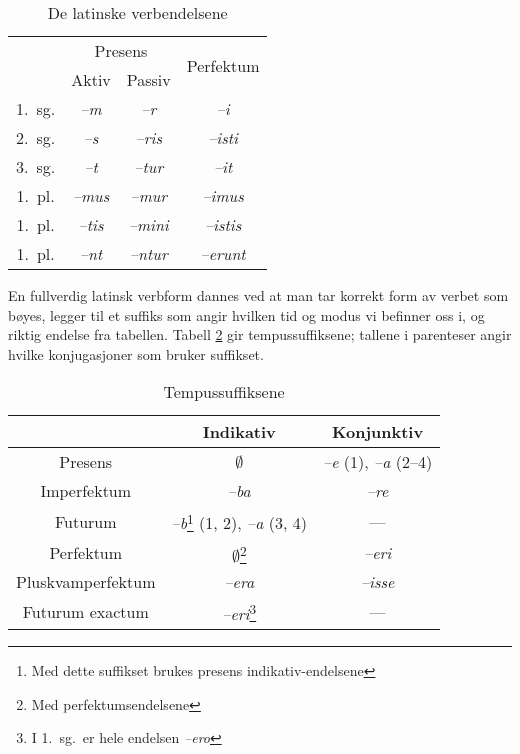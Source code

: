 \documentclass[a4paper]{article}
\begin{document}
\begin{table}[hp]
\begin{center}
\begin{tabular}{|c|c|c|c|}
    \hline
       & \multicolumn{2}{c|}{Presens} & \multirow{2}{*}{Perfektum} \\ \cline{2-3}
       & Aktiv & Passiv & \\
    \hline
1.~sg. & \emph{--m}   & \emph{--r}    & \emph{--i}       \\
2.~sg. & \emph{--s}   & \emph{--ris}  & \emph{--isti}    \\
3.~sg. & \emph{--t}   & \emph{--tur}  & \emph{--it}      \\
1.~pl. & \emph{--mus} & \emph{--mur}  & \emph{--imus}    \\
1.~pl. & \emph{--tis} & \emph{--mini} & \emph{--istis}   \\
1.~pl. & \emph{--nt}  & \emph{--ntur} & \emph{--erunt}   \\
    \hline
\end{tabular}
\caption{De latinske verbendelsene}
\label{endelser}
\end{center}
\end{table}

En fullverdig latinsk verbform dannes ved at man tar korrekt form av verbet
som b\o{}yes, legger til et suffiks som angir hvilken tid og modus vi befinner
oss i, og riktig endelse fra tabellen. Tabell \ref{tempus} gir
tempussuffiksene; tallene i parenteser angir hvilke konjugasjoner som bruker
suffikset.

\begin{table}[hp]
\begin{minipage}{\textwidth}
\begin{center}
\begin{tabular}{|c|c|c|}
    \hline
                  & Indikativ   & Konjunktiv \\
    \hline
Presens           & $\emptyset$ & \emph{--e} (1), \emph{--a} (2--4) \\
Imperfektum       & \emph{--ba} & \emph{--re} \\
Futurum           & \emph{--b}\footnote{Med dette suffikset brukes presens
indikativ-endelsene} (1, 2), \emph{--a} (3, 4) & --- \\
    \hline
Perfektum         & $\emptyset$\footnote{Med perfektumsendelsene} & \emph{--eri} \\
Pluskvamperfektum & \emph{--era} & \emph{--isse} \\
Futurum exactum   & \emph{--eri}\footnote{I 1.~sg.~er hele endelsen
\emph{--ero}} & ---        \\
    \hline
\end{tabular}
\end{center}
\end{minipage}
\caption{Tempussuffiksene}
\label{tempus}
\end{table}
\end{document}
